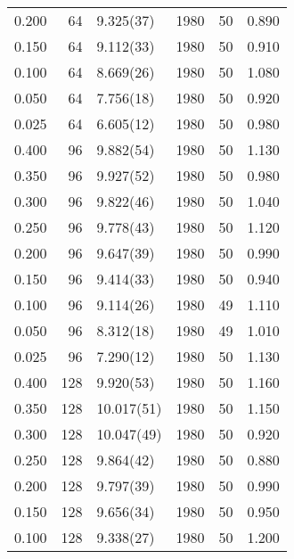 \begin{tabular}{rrlrrr}
 0.200 &      64 & 9.325(37)  &                1980 &                  50 &    0.890 \\
 0.150 &      64 & 9.112(33)  &                1980 &                  50 &    0.910 \\
 0.100 &      64 & 8.669(26)  &                1980 &                  50 &    1.080 \\
 0.050 &      64 & 7.756(18)  &                1980 &                  50 &    0.920 \\
 0.025 &      64 & 6.605(12)  &                1980 &                  50 &    0.980 \\
 0.400 &      96 & 9.882(54)  &                1980 &                  50 &    1.130 \\
 0.350 &      96 & 9.927(52)  &                1980 &                  50 &    0.980 \\
 0.300 &      96 & 9.822(46)  &                1980 &                  50 &    1.040 \\
 0.250 &      96 & 9.778(43)  &                1980 &                  50 &    1.120 \\
 0.200 &      96 & 9.647(39)  &                1980 &                  50 &    0.990 \\
 0.150 &      96 & 9.414(33)  &                1980 &                  50 &    0.940 \\
 0.100 &      96 & 9.114(26)  &                1980 &                  49 &    1.110 \\
 0.050 &      96 & 8.312(18)  &                1980 &                  49 &    1.010 \\
 0.025 &      96 & 7.290(12)  &                1980 &                  50 &    1.130 \\
 0.400 &     128 & 9.920(53)  &                1980 &                  50 &    1.160 \\
 0.350 &     128 & 10.017(51) &                1980 &                  50 &    1.150 \\
 0.300 &     128 & 10.047(49) &                1980 &                  50 &    0.920 \\
 0.250 &     128 & 9.864(42)  &                1980 &                  50 &    0.880 \\
 0.200 &     128 & 9.797(39)  &                1980 &                  50 &    0.990 \\
 0.150 &     128 & 9.656(34)  &                1980 &                  50 &    0.950 \\
 0.100 &     128 & 9.338(27)  &                1980 &                  50 &    1.200 \\

\end{tabular}
